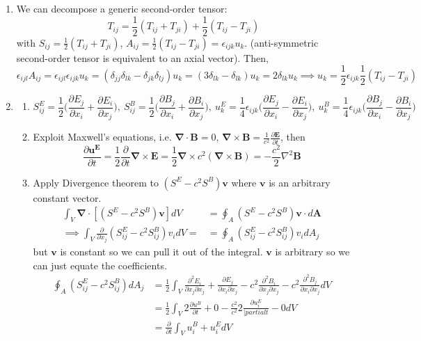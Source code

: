 \documentclass[a4paper]{article}
\begin{document}
\begin{ans}\leavevmode
\begin{enumerate}[label=(\alph*)]
\item We can decompose a generic second-order tensor:
$$T_{ij}=\frac{1}{2}(T_{ij}+T_{ji})+\frac{1}{2}(T_{ij}-T_{ji})$$
with $S_{ij}=\frac{1}{2}(T_{ij}+T_{ji})$, $A_{ij}=\frac{1}{2}(T_{ij}-T_{ji})=\epsilon_{ijk}u_k$. (anti-symmetric second-order tensor is equivalent to an axial vector). Then,
$$\epsilon_{ijl}A_{ij}=\epsilon_{ijl}\epsilon_{ijk}u_k=(\delta_{jj}\delta_{lk}-\delta_{jk}\delta_{lj})u_k=(3\delta_{lk}-\delta_{lk})u_k=2\delta_{lk}u_k\implies u_k=\frac{1}{2}\epsilon_{ijk}\frac{1}{2}(T_{ij}-T_{ji})$$
\item
\begin{enumerate}[label=(\roman*)]
\item $$S_{ij}^{E}=\frac{1}{2}\bigg(\frac{\partial E_j}{\partial x_i}+\frac{\partial E_i}{\partial x_j}\bigg),~S_{ij}^{B}=\frac{1}{2}\bigg(\frac{\partial B_j}{\partial x_i}+\frac{\partial B_i}{\partial x_j}\bigg),~ u^E_k=\frac{1}{4}\epsilon_{ijk}\bigg(\frac{\partial E_j}{\partial x_i}-\frac{\partial E_i}{\partial x_j}\bigg),~u^B_k=\frac{1}{4}\epsilon_{ijk}\bigg(\frac{\partial B_j}{\partial x_i}-\frac{\partial B_i}{\partial x_j}\bigg)$$
\item Exploit Maxwell's equations, i.e. $\boldsymbol{\nabla}\cdot\mathbf{B}=0$, $\boldsymbol{\nabla}\times\mathbf{B}=\frac{1}{c^2}\frac{\partial\mathbf{E}}{\partial t}$, then
$$\frac{\partial\mathbf{u^E}}{\partial t}=\frac{1}{2}\frac{\partial}{\partial t}\boldsymbol{\nabla}\times\mathbf{E}=\frac{1}{2}\boldsymbol{\nabla}\times c^2(\boldsymbol{\nabla}\times\mathbf{B})=-\frac{c^2}{2}\nabla^2\mathbf{B}$$
\item Apply Divergence theorem to $(S^E-c^2S^B)\mathbf{v}$ where $\mathbf{v}$ is an arbitrary constant vector.
\begin{align}
    \int_V\boldsymbol{\nabla}\cdot[(S^E-c^2S^B)\mathbf{v}]dV&=\oint_A(S^E-c^2S^B)\mathbf{v}\cdot d\mathbf{A}\nonumber\\\implies\int_V\frac{\partial}{\partial x_j}(S_{ij}^E-c^2S_{ij}^B)v_idV=&=\oint_A(S_{ij}^E-c^2S_{ij}^B)v_idA_j\nonumber
\end{align}
but $\mathbf{v}$ is constant so we can pull it out of the integral. $\mathbf{v}$ is arbitrary so we can just equate the coefficients. 
\begin{align}
    \oint_A(S_{ij}^E-c^2S_{ij}^B)dA_j&=\frac{1}{2}\int_V\frac{\partial^2E_i}{\partial x_j\partial x_j}+\frac{\partial E_j}{\partial x_i\partial x_j}-c^2\frac{\partial^2B_i}{\partial x_j\partial x_j}-c^2\frac{\partial^2B_j}{\partial x_i\partial x_j}dV\nonumber\\&=\frac{1}{2}\int_V2\frac{\partial u^B}{\partial t}+0-\frac{c^2}{c^2}2\frac{\partial u_i^E}{|partial t}-0dV\nonumber\\&=\frac{\partial}{\partial t}\int_Vu_i^B+u_i^EdV\nonumber

\end{align}
\end{enumerate}
\end{enumerate}
\end{ans}
\end{document}
